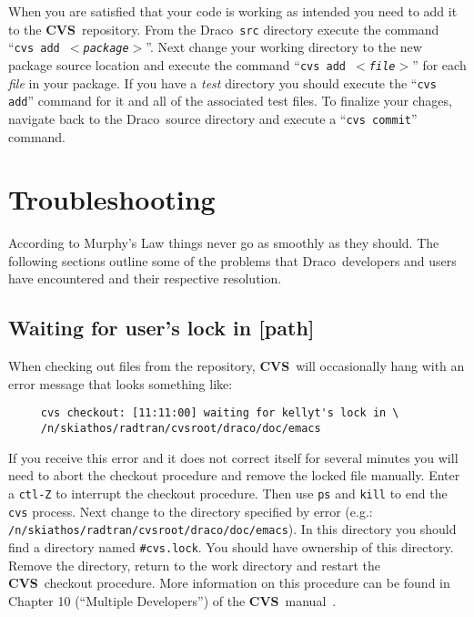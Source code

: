 \documentclass[11pt]{nmemo}
\newcommand{\comp}[1]{\normalfont\normalsize\texttt{#1}}
\newcommand{\draco}{{\normalfont\sffamily Draco}}
\newcommand{\cvs}{{\normalfont\bfseries CVS}}
\begin{document}
When you are satisfied that your code is working as intended you need
to add it to the \cvs\ repository.  From the \draco\ \comp{src}
directory execute the command ``\comp{cvs add $<$\emph{package}$>$}''.
Next change your working directory to the new package source location
and execute the command ``\comp{cvs add $<$\emph{file}$>$}'' for each
\emph{file} in your package.  If you have a \emph{test} directory you
should execute the ``\comp{cvs add}'' command for it and all of the
associated test files.  To finalize your chages, navigate back to the
\draco\ source directory and execute a ``\comp{cvs commit}'' command.


\section{Troubleshooting}

According to Murphy's Law things never go as smoothly as they should.
The following sections outline some of the problems that \draco\ 
developers and users have encountered and their respective resolution.

\subsection{Waiting for user's lock in [path]}

When checking out files from the repository, \cvs\ will occasionally
hang with an error message that looks something like:
\begin{verbatim}
     cvs checkout: [11:11:00] waiting for kellyt's lock in \
     /n/skiathos/radtran/cvsroot/draco/doc/emacs
\end{verbatim}
If you receive this error and it does not correct itself for several
minutes you will need to abort the checkout procedure and remove the
locked file manually.  Enter a \comp{ctl-Z} to interrupt the checkout
procedure.  Then use \comp{ps} and \comp{kill} to end the \comp{cvs}
process.  Next change to the directory specified by error (e.g.:
\comp{/n/skiathos/radtran/cvsroot/draco/doc/emacs}).  In this
directory you should find a directory named \comp{\#cvs.lock}.  You
should have ownership of this directory.  Remove the directory, return
to the work directory and restart the \cvs\ checkout procedure.  More
information on this procedure can be found in Chapter 10 (``Multiple
Developers'') of the \cvs\ manual~\cite{cvs}.
\end{document}
